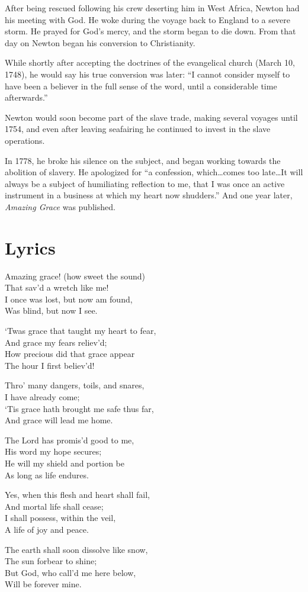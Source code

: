 \documentclass[10pt,a4paper,oneside,twocolumn]{book}
\begin{document}
After being rescued following his crew deserting him in West Africa, Newton had his meeting with God. He woke during the voyage back to England to a severe storm. He prayed for God's mercy, and the storm began to die down. From that day on Newton began his conversion to Christianity.

While shortly after accepting the doctrines of the evangelical church (March 10, 1748), he would say his true conversion was later: ``I cannot consider myself to have been a believer in the full sense of the word, until a considerable time afterwards.''

Newton would soon become part of the slave trade, making several voyages until 1754, and even after leaving seafairing he continued to invest in the slave operations.

In 1778, he broke his silence on the subject, and began working towards the abolition of slavery. He apologized for ``a confession, which\ldots comes too late\ldots It will always be a subject of humiliating reflection to me, that I was once an active instrument in a business at which my heart now shudders.'' And one year later, \textit{Amazing Grace} was published.

\section{Lyrics}
\begin{flushleft}
Amazing grace! (how sweet the sound)\\
That sav'd a wretch like me!\\
I once was lost, but now am found,\\
Was blind, but now I see.
\medskip

`Twas grace that taught my heart to fear,\\
And grace my fears reliev'd;\\
How precious did that grace appear\\
The hour I first believ'd!
\medskip

Thro' many dangers, toils, and snares,\\
I have already come;\\
`Tis grace hath brought me safe thus far,\\
And grace will lead me home.
\medskip

The Lord has promis'd good to me,\\
His word my hope secures;\\
He will my shield and portion be\\
As long as life endures.
\medskip

Yes, when this flesh and heart shall fail,\\
And mortal life shall cease;\\
I shall possess, within the veil,\\
A life of joy and peace.
\medskip

The earth shall soon dissolve like snow,\\
The sun forbear to shine;\\
But God, who call'd me here below,\\
Will be forever mine.
\end{flushleft}
\end{document}
